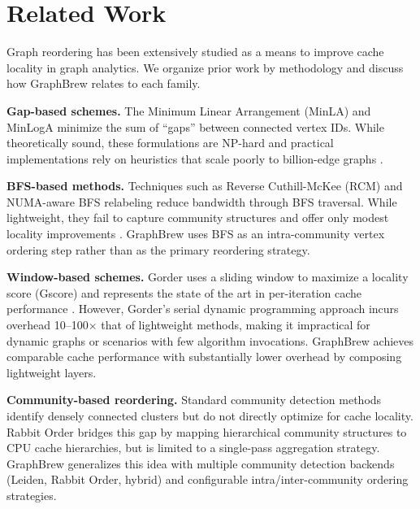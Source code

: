 \documentclass[sigconf, nonacm]{acmart}
\begin{document}
\section{Related Work}
\label{sec:related}

Graph reordering has been extensively studied as a means to improve cache locality in graph analytics. We organize prior work by methodology and discuss how GraphBrew relates to each family.

\textbf{Gap-based schemes.} The Minimum Linear Arrangement (MinLA) \cite{petit_experiments_2004} and MinLogA \cite{boldi_webgraph_2003} minimize the sum of ``gaps'' between connected vertex IDs. While theoretically sound, these formulations are NP-hard and practical implementations rely on heuristics that scale poorly to billion-edge graphs \cite{barik_vertex_2020}.

\textbf{BFS-based methods.} Techniques such as Reverse Cuthill-McKee (RCM) \cite{cuthill_reducing_1969} and NUMA-aware BFS relabeling \cite{frasca_numa-aware_2012,karypis_fast_1998,karantasis_parallelization_2014} reduce bandwidth through BFS traversal. While lightweight, they fail to capture community structures and offer only modest locality improvements \cite{arai_rabbit_2016}. GraphBrew uses BFS as an intra-community vertex ordering step rather than as the primary reordering strategy.

\textbf{Window-based schemes.} Gorder \cite{wei_speedup_2016} uses a sliding window to maximize a locality score (Gscore) and represents the state of the art in per-iteration cache performance \cite{barik_vertex_2020}. However, Gorder's serial dynamic programming approach incurs overhead 10--100$\times$ that of lightweight methods, making it impractical for dynamic graphs or scenarios with few algorithm invocations. GraphBrew achieves comparable cache performance with substantially lower overhead by composing lightweight layers.

\textbf{Community-based reordering.} Standard community detection methods \cite{broder_resemblance_1997, chierichetti_compressing_2009, lasalle_multi-threaded_2013, george_nested_1973} identify densely connected clusters but do not directly optimize for cache locality. Rabbit Order \cite{arai_rabbit_2016} bridges this gap by mapping hierarchical community structures to CPU cache hierarchies, but is limited to a single-pass aggregation strategy. GraphBrew generalizes this idea with multiple community detection backends (Leiden, Rabbit Order, hybrid) and configurable intra/inter-community ordering strategies.
\end{document}
